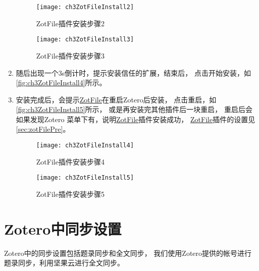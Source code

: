 \documentclass[cn,11pt,chinese]{elegantbook}
\begin{document}
\begin{enumerate}
			\begin{figure}[htbp]
				\begin{minipage}[t]{0.6\linewidth}
					\centering
					\texttt{[image: ch3ZotFileInstall2]}
					\caption{ZotFile插件安装步骤2}
					\label{fig:ch3ZotFileInstall2}
				\end{minipage}
				\begin{minipage}[t]{0.3\linewidth}
					\centering
					\texttt{[image: ch3ZotFileInstall3]}
					\caption{ZotFile插件安装步骤3}
					\label{fig:ch3ZotFileInstall3}
				\end{minipage}
			\end{figure}
			\item
			随后出现一个3s倒计时，提示安装信任的扩展，结束后，
			点击开始安装，如\autoref{fig:ch3ZotFileInstall4}所示。
			\item
			安装完成后，会提示\href{http://zotfile.com/}{ZotFile}在重启Zotero后安装，
			点击重启，如\autoref{fig:ch3ZotFileInstall5}所示，
			或是再安装完其他插件后一块重启，
			重启后会如果发现Zotero 菜单下有，说明\href{http://zotfile.com/}{ZotFile}插件安装成功，
			\href{http://zotfile.com/}{ZotFile}插件的设置见\cref{sec:zotFilePre}。
			\begin{figure}[htbp]
				\centering
				\texttt{[image: ch3ZotFileInstall4]}
				\caption{ZotFile插件安装步骤4}
				\label{fig:ch3ZotFileInstall4}
			\end{figure}
			
			\begin{figure}[htbp]
				\centering
				\texttt{[image: ch3ZotFileInstall5]}
				\caption{ZotFile插件安装步骤5}
				\label{fig:ch3ZotFileInstall5}
			\end{figure}
		\end{enumerate}
		
	\section{Zotero中同步设置}\label{sec:syn}
		Zotero中的同步设置包括题录同步和全文同步，
		我们使用Zotero提供的帐号进行题录同步，利用坚果云进行全文同步。
		
\end{document}
